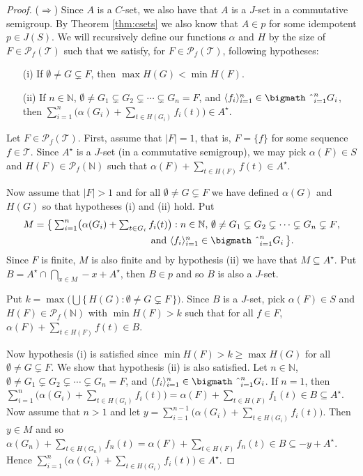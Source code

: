 \documentclass[12pt,showtrims]{memoir}
\theoremstyle{plain}
\theoremstyle{definition}
\newcommand{\la}{\langle}
\newcommand{\ra}{\rangle}
\newcommand{\bbN}{\mathbb{N}}
\newcommand{\calT}{\mathcal{T}}
\newcommand{\Pf}{\mathcal{P}_f}
\newcommand{\bigtimes}{\hbox{\bigmath \char'2}}
\begin{document}
\begin{proof}
  ($\Rightarrow$)
  Since $A$ is a $C$-set, we also have that $A$ is a $J$-set in a commutative semigroup.
  By Theorem \ref{thm:csets} we also know that $A \in p$ for some idempotent $p \in J(S)$. 
  We will recursively define our functions $\alpha$ and $H$ by the size of $F \in \Pf(\calT)$ such that we satisfy, for $F \in \Pf(\calT)$, following hypotheses:
  \begin{itemize}
    \item[(i)] If $\emptyset \ne G \subsetneq F$, then $\max H(G) < \min H(F)$.
      
    \item[(ii)] If $n \in \bbN$, $\emptyset \ne G_1 \subsetneq G_2 \subsetneq \cdots \subsetneq G_n = F$, and $\la f_i \ra_{i=1}^n \in \bigtimes_{i=1}^n G_i$, then $\sum_{i=1}^n\bigl( \alpha(G_i) + \sum_{t \in H(G_i)} f_i(t)\bigr) \in A^\star$. 
  \end{itemize}
  
  Let $F \in \Pf(\calT)$.
  First, assume that $|F| = 1$, that is, $F = \{f\}$ for some sequence $f \in \calT$.
  Since $A^\star$ is a $J$-set (in a commutative semigroup), we may pick $\alpha(F) \in S$ and $H(F) \in \Pf(\bbN)$ such that $\alpha(F) + \sum_{t \in H(F)} f(t) \in A^\star$.

  Now assume that $|F| > 1$ and for all $\emptyset \ne G \subsetneq F$ we have defined $\alpha(G)$ and $H(G)$ so that hypotheses (i) and (ii) hold.
  Put
  \begin{align*}
    M &=\textstyle \bigl\{\, \sum_{i=1}^n \bigl( \alpha(G_i) + \sum_{t \in G_i} f_i(t) \bigr) : \mbox{$n \in \bbN$, $\emptyset \ne G_1 \subsetneq G_2 \subsetneq \cdots \subsetneq G_n \subsetneq F$,} \\
    &\hspace{12em} \mbox{and $\la f_i \ra_{i=1}^n \in \bigtimes_{i=1}^n G_i$} \,\bigr\}.
  \end{align*}
  Since $F$ is finite, $M$ is also finite and by hypothesis (ii) we have that $M \subseteq A^\star$.
  Put $B = A^\star \cap \bigcap_{x \in M} -x+A^\star$, then $B \in p$ and so $B$ is also a $J$-set.

  Put $k = \max \bigl( \bigcup\{\, H(G) : \emptyset \ne G \subsetneq F\,\} \bigr)$.
  Since $B$ is a $J$-set, pick $\alpha(F) \in S$ and $H(F) \in \Pf(\bbN)$ with $\min H(F) > k$ such that for all $f \in F$, $\alpha(F) + \sum_{t \in H(F)} f(t) \in B$. 

  Now hypothesis (i) is satisfied since $\min H(F) > k \ge \max H(G)$ for all $\emptyset \ne G \subsetneq F$. 
  We show that hypothesis (ii) is also satisfied.
  Let $n \in \bbN$, $\emptyset \ne G_1 \subsetneq G_2 \subsetneq \cdots \subsetneq G_n = F$, and $\la f_i \ra_{i=1}^n \in \bigtimes_{i=1}^n G_i$. 
  If $n = 1$, then $\sum_{i=1}^n \bigl( \alpha(G_i) + \sum_{t \in H(G_i)} f_i(t)\bigr) = \alpha(F) + \sum_{t \in H(F)} f_1(t) \in B \subseteq A^\star$. 
  Now assume that $n > 1$ and let $y = \sum_{i=1}^{n-1}\bigl( \alpha(G_i) + \sum_{t \in H(G_i)} f_i(t) \bigr)$.
  Then $y \in M$ and so $\alpha(G_n) + \sum_{t \in H(G_n)} f_n(t) = \alpha(F) + \sum_{t \in H(F)} f_n(t) \in B \subseteq -y + A^\star$. 
  Hence $\sum_{i=1}^n\bigl( \alpha(G_i) + \sum_{t \in H(G_i)} f_i(t) \bigr) \in A^\star$.


\end{proof}
\end{document}
